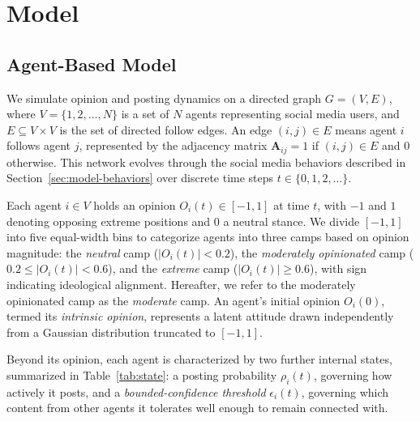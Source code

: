 \documentclass{svproc}
\def\post{\rho}                 %
\def\BoundedConfidence{\epsilon} %
\def\Stubbornness{\mu}           %
\begin{document}
\section{Model}\label{sec:model}
\subsection{Agent-Based Model}\label{sec:model-abm}
We simulate opinion and posting dynamics on a directed graph
$G=(V,E)$, where $V=\{1,2,\dots,N\}$ is a set of $N$ agents
representing social media users, and $E\subseteq V\times V$ is the set
of directed follow edges. An edge $(i,j)\in E$ means agent $i$ follows
agent $j$, represented by the adjacency matrix $\mathbf{A}_{ij}=1$ if
$(i,j)\in E$ and $0$ otherwise. This network evolves through the
social media behaviors described in Section~\ref{sec:model-behaviors}
over discrete time steps $t\in\{0,1,2,\dots\}$.
\par


Each agent $i\in V$ holds an opinion $O_i(t)\in[-1,1]$ at time $t$,
with $-1$ and $1$ denoting opposing extreme positions and $0$ a
neutral stance. We divide $[-1,1]$ into five equal-width bins to
categorize agents into three camps based on opinion magnitude: the
\emph{neutral} camp ($\vert O_i(t)\vert <0.2$), the
\emph{moderately opinionated} camp ($0.2\le\vert O_i(t)\vert<0.6$), and the
\emph{extreme} camp ($\vert O_i(t)\vert\ge0.6$), with sign indicating
ideological alignment. 
Hereafter, we refer to the moderately opinionated camp as 
the \emph{moderate} camp.
An agent's initial opinion $O_i(0)$, termed its
\emph{intrinsic opinion}, represents a latent attitude drawn
independently from a Gaussian distribution truncated to $[-1,1]$.
\par


Beyond its opinion, each agent is characterized by two further
internal states, summarized in Table~\ref{tab:state}: a posting
probability $\post_i(t)$, governing how actively it posts, and a
\emph{bounded-confidence threshold} $\BoundedConfidence_i(t)$,
governing which content from other agents it tolerates well enough to
remain connected with.
\par

\end{document}
